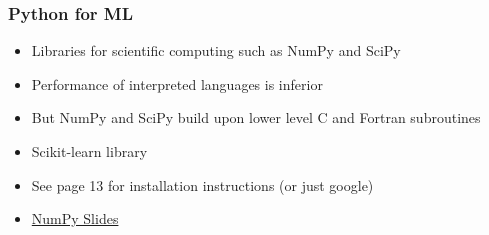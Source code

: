 \documentclass{beamer}
\begin{document}
\begin{frame}
  \frametitle{Python for ML}
  \begin{itemize}
  \item Libraries for scientific computing such as NumPy and SciPy
  \item Performance of interpreted languages is inferior
  \item But NumPy and SciPy build upon lower level C and Fortran subroutines
  \item Scikit-learn library
  \item See page 13 for installation instructions (or just google)
  \item \href{http://www.mpia.de/~robitaille/PY4SCI\_WS\_2013\_14/}{NumPy Slides}
  \end{itemize}
\end{frame}
\end{document}
